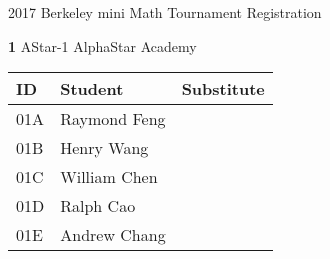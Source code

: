 \documentclass[12pt]{amsart}
\begin{document}
\renewcommand\arraystretch{3.5}
\large

\newcommand{\TeamID}{1}
\newcommand{\TeamName}{AStar-1}
\newcommand{\SchoolName}{AlphaStar Academy}
\newcommand{\IDA}{01A}
\newcommand{\IDB}{01B}
\newcommand{\IDC}{01C}
\newcommand{\IDD}{01D}
\newcommand{\IDE}{01E}
\newcommand{\StudentA}{Raymond Feng}
\newcommand{\StudentB}{Henry Wang}
\newcommand{\StudentC}{William Chen}
\newcommand{\StudentD}{Ralph Cao}
\newcommand{\StudentE}{Andrew Chang}

\begin{center}
{\sc \Large 2017 Berkeley mini Math Tournament Registration}

\bigskip
\bigskip

{\bf \Large  \TeamID} \hfill {\large \TeamName} \hfill {\large \SchoolName}

\bigskip
\bigskip

\begin{tabular}{| p{} | p{} | p{} |}
\hline
\bf ID         & \bf Student             & \bf Substitute             \\ \hline
\IDA           & \StudentA               &                            \\ \hline
\IDB           & \StudentB               &                            \\ \hline
\IDC           & \StudentC               &                            \\ \hline
\IDD           & \StudentD               &                            \\ \hline
\IDE           & \StudentE               &                            \\ \hline
\end{tabular} 
\end{center}
\bigskip
\bigskip

\newpage



\renewcommand{\TeamID}{2}
\renewcommand{\TeamName}{AStar-2}
\renewcommand{\SchoolName}{AlphaStar Academy}
\renewcommand{\IDA}{02A}
\renewcommand{\IDB}{02B}
\renewcommand{\IDC}{02C}
\renewcommand{\IDD}{02D}
\renewcommand{\IDE}{02E}
\renewcommand{\StudentA}{Rohan Penmatcha}
\renewcommand{\StudentB}{Eric Shen}
\renewcommand{\StudentC}{Andrew Wen}
\renewcommand{\StudentD}{Catherine Li}
\renewcommand{\StudentE}{Alex Gu}
\end{document}
